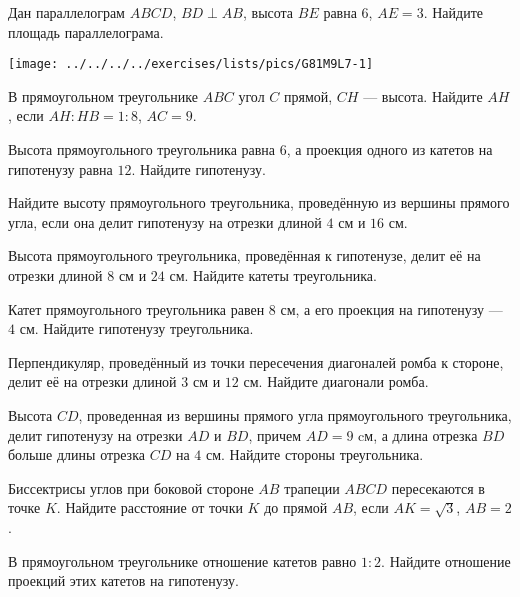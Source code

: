 \begin{class}[number=7]
	\begin{listofex}
		\item 
		\begin{minipage}[t]{\bodywidth}
			 Дан параллелограм \( ABCD \), \( BD\perp AB \), высота \( BE \) равна \( 6 \), \( AE=3 \). Найдите площадь параллелограма. 
		\end{minipage}
		\hspace{0.02\linewidth}
		\begin{minipage}[t]{\picwidth}
			\texttt{[image: ../../../../exercises/lists/pics/G81M9L7-1]}
		\end{minipage}
		\item  В прямоугольном треугольнике \( ABC \) угол \( C \) прямой, \( CH  \) --- высота. Найдите \( AH \), если \( AH : HB = 1 : 8 \), \( AC = 9 \).
		\item Высота прямоугольного треугольника равна \( 6 \), а проекция одного из катетов на гипотенузу равна \( 12 \). Найдите гипотенузу.
		\item Найдите высоту прямоугольного треугольника, проведённую из вершины прямого угла, если она делит гипотенузу на отрезки длиной \( 4 \) см и \( 16 \) см.
		\item Высота прямоугольного треугольника, проведённая к гипотенузе, делит её на отрезки длиной \( 8 \) см и \( 24 \) см. Найдите катеты треугольника.
		\item Катет прямоугольного треугольника равен \( 8 \) см, а его проекция на гипотенузу --- \( 4 \) см. Найдите гипотенузу треугольника.
		\item Перпендикуляр, проведённый из точки пересечения диагоналей ромба к стороне, делит её на отрезки длиной \( 3 \) см и \( 12 \) см. Найдите диагонали ромба.
		\item Высота \( CD \), проведенная из вершины прямого угла прямоугольного треугольника, делит гипотенузу на отрезки \( AD \) и \( BD \), причем \( AD = 9 \) cм, а длина отрезка \( BD \) больше длины отрезка \( CD \) на \( 4 \) см. Найдите стороны треугольника.
		\item Биссектрисы углов при боковой стороне \( AB  \) трапеции \( ABCD  \) пересекаются в точке \( K \). Найдите расстояние от точки \( K \) до прямой \( AB \), если \( AK = \sqrt{3} \), \( AB = 2 \).
		\item В прямоугольном треугольнике отношение катетов равно \( 1 : 2 \). Найдите отношение проекций этих катетов на гипотенузу.

\end{listofex}
\end{class}

